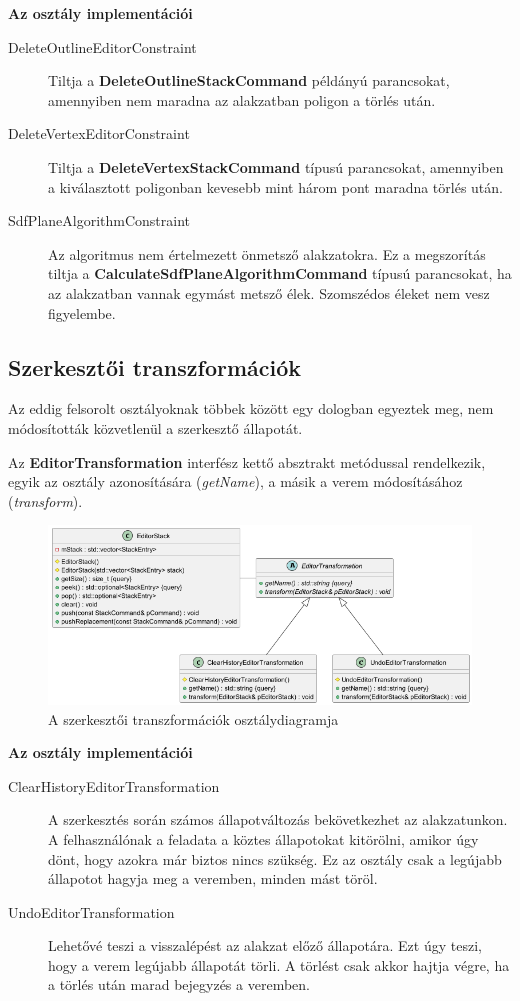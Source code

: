 \textbf{Az osztály implementációi}

\begin{description}
	\item[DeleteOutlineEditorConstraint] Tiltja a \textbf{DeleteOutlineStackCommand} példányú parancsokat, amennyiben nem maradna az alakzatban poligon a törlés után.
	\item[DeleteVertexEditorConstraint] Tiltja a \textbf{DeleteVertexStackCommand} típusú parancsokat, amennyiben a kiválasztott poligonban kevesebb mint három pont maradna törlés után.
	\item[SdfPlaneAlgorithmConstraint] Az algoritmus nem értelmezett önmetsző alakzatokra. Ez a megszorítás tiltja a \textbf{CalculateSdfPlaneAlgorithmCommand} típusú parancsokat, ha az alakzatban vannak egymást metsző élek. Szomszédos éleket nem vesz figyelembe.
\end{description}

\subsection{Szerkesztői transzformációk}

Az eddig felsorolt osztályoknak többek között egy dologban egyeztek meg, nem módosították közvetlenül a szerkesztő állapotát.

Az \textbf{EditorTransformation} interfész kettő absztrakt metódussal rendelkezik, egyik az osztály azonosítására (\textit{getName}), a másik a verem módosításához (\textit{transform}).

\begin{figure}[H]
	\centering
	\includegraphics[width=1\linewidth]{images/class_editor_transformation.png}
	\caption{A szerkesztői transzformációk osztálydiagramja}
	\label{fig:class_editor_transformation-1}
\end{figure}

\textbf{Az osztály implementációi}

\begin{description}
	\item[ClearHistoryEditorTransformation] A szerkesztés során számos állapotváltozás bekövetkezhet az alakzatunkon. A felhasználónak a feladata a köztes állapotokat kitörölni, amikor úgy dönt, hogy azokra már biztos nincs szükség. Ez az osztály csak a legújabb állapotot hagyja meg a veremben, minden mást töröl.
	\item[UndoEditorTransformation] Lehetővé teszi a visszalépést az alakzat előző állapotára. Ezt úgy teszi, hogy a verem legújabb állapotát törli. A törlést csak akkor hajtja végre, ha a törlés után marad bejegyzés a veremben.
\end{description}


